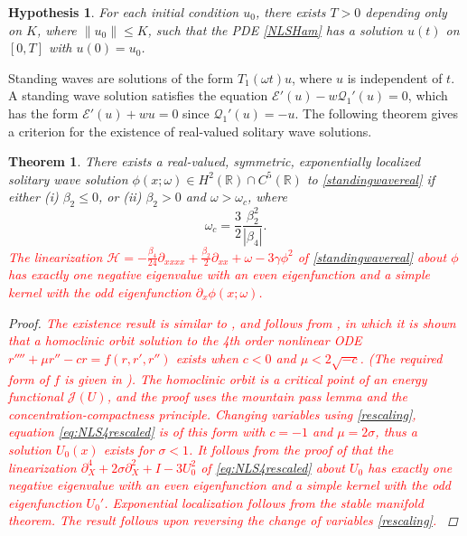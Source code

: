 \documentclass[12pt]{elsarticle}
\def\R{{\mathbb R}}
\def\calH{{\mathcal H}}
\def\calE{{\mathcal E}}
\def\calQ{{\mathcal Q}}
\def\calJ{{\mathcal J}}
\newtheorem{theorem}{Theorem}
\newtheorem{hypothesis}{Hypothesis}
\newcommand{\revised}[1]{ \textcolor{red}{#1} }
\begin{document}
\begin{hypothesis}\label{hyp:wp}
For each initial condition $u_0$, there exists $T > 0$ depending only on $K$, where $\|u_0\| \leq K$, such that the PDE \cref{NLSHam} has a solution $u(t)$ on $[0, T]$ with $u(0) = u_0$.
\end{hypothesis}

Standing waves are solutions of the form $T_1(\omega t) u$, where $u$ is independent of $t$. A standing wave solution satisfies the equation $\calE'(u) - w \calQ_1'(u) = 0$, which has the form $\calE'(u) + w u = 0$ since $\calQ_1'(u) = -u$. The following theorem gives a criterion for the existence of real-valued solitary wave solutions.

\begin{theorem}\label{theorem:solitonexist}
There exists a real-valued, symmetric, exponentially localized solitary wave solution $\phi(x; \omega) \in H^2(\R) \cap C^5(\R)$ to \cref{standingwavereal} if either (i) $\beta_2 \leq 0$, or (ii) $\beta_2 > 0$ and $\omega > \omega_c$, where 
\begin{equation}\label{omegac}
\omega_c = \frac{3}{2} \frac{\beta_2^2}{|\beta_4|}.
\end{equation}
\revised{The linearization $\calH = -\frac{\beta_4}{24} \partial_{xxxx} + \frac{\beta_2}{2} \partial_{xx} + \omega - 3 \gamma \phi^2$ of \cref{standingwavereal} about $\phi$ has exactly one negative eigenvalue with an even eigenfunction and a simple kernel with the odd eigenfunction $\partial_x \phi(x; \omega)$.}
\begin{proof}
\revised{The existence result is similar to \cite[Theorem 2.1(i)]{Pelinovsky2007},  and follows from \cite{Groves1998}, in which it is shown that a homoclinic orbit solution to the 4th order nonlinear ODE $r'''' + \mu r'' - cr = f(r, r', r'')$ exists when $c < 0$ and $\mu < 2 \sqrt{-c}$. (The required form of $f$ is given in \cite{Groves1998}). The homoclinic orbit is a critical point of an energy functional $\calJ(U)$, and the proof uses the mountain pass lemma and the concentration-compactness principle. Changing variables using \cref{rescaling}, equation \cref{eq:NLS4rescaled} is of this form with $c = -1$ and $\mu = 2 \sigma$, thus a solution $U_0(x)$ exists for $\sigma < 1$. It follows from the proof of \cite[Theorem 2.1(ii)]{Pelinovsky2007} that the linearization $\partial_X^4 + 2 \sigma \partial_X^2 + I - 3 U_0^2$ of \cref{eq:NLS4rescaled} about $U_0$ has exactly one negative eigenvalue with an even eigenfunction and a simple kernel with the odd eigenfunction $U_0'$. Exponential localization follows from the stable manifold theorem. The result follows upon reversing the change of variables \cref{rescaling}.
}
\end{proof}
\end{theorem}
\end{document}
